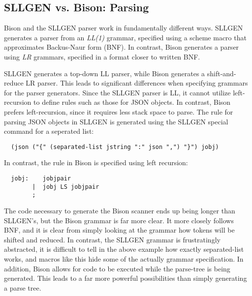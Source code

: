 \documentclass[12pt]{article}
\begin{document}
\subsection{SLLGEN vs. Bison: Parsing}
Bison and the SLLGEN parser work in fundamentally different ways.
SLLGEN generates a parser from an \textit{LL(1)} grammar, specified
using a scheme macro that approximates Backus-Naur form (BNF).  In
contrast, Bison generates a parser using \textit{LR} grammars,
specified in a format closer to written BNF.\par
SLLGEN generates a top-down LL parser, while Bison generates a
shift-and-reduce LR parser.  This leads to significant differences
when specifying grammars for the parser generators.  Since the SLLGEN
parser is LL, it cannot utilize left-recursion to define rules such as
those for JSON objects\cite[pg.67]{compilers}.  In contrast, Bison
prefers left-recursion, since it requires less stack space to
parse.\cite[3.3.3]{bison} The rule for parsing JSON objects
in SLLGEN is generated using the SLLGEN special command for a
seperated list:
\begin{lstlisting}
  (json ("{" (separated-list jstring ":" json ",") "}") jobj)
\end{lstlisting}
In contrast, the rule in Bison is specified using left recursion:
\begin{lstlisting}
  jobj:    jobjpair
        |  jobj LS jobjpair
        ;
\end{lstlisting}
The code necessary to generate the Bison scanner ends up being longer
than SLLGEN's, but the Bison grammar is far more clear.  It more
closely follows BNF, and it is clear from simply looking at the
grammar how tokens will be shifted and reduced.  In contrast, the
SLLGEN grammar is frustratingly abstracted, it is difficult to tell in
the above example how exactly separated-list works, and macros like
this hide some of the actually grammar specification.  In addition,
Bison allows for code to be executed while the parse-tree is being
generated.  This leads to a far more powerful possibilities than simply
generating a parse tree.
\end{document}
